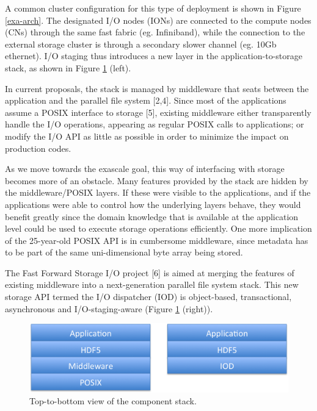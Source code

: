 \documentclass[conference]{IEEEtran}
\begin{document}
A common cluster configuration for this type of deployment is shown in
Figure \ref{exa-arch}. The designated I/O nodes (IONs) are connected to
the compute nodes (CNs) through the same fast fabric (eg. Infiniband),
while the connection to the external storage cluster is through a
secondary slower channel (eg. 10Gb ethernet). I/O staging thus
introduces a new layer in the application-to-storage stack, as shown in
Figure \ref{exa-stack} (left).

In current proposals, the stack is managed by middleware that seats
between the application and the parallel file system {[}2,4{]}. Since
most of the applications assume a POSIX interface to storage {[}5{]},
existing middleware either transparently handle the I/O operations,
appearing as regular POSIX calls to applications; or modify the I/O API
as little as possible in order to minimize the impact on production
codes.

As we move towards the exascale goal, this way of interfacing with
storage becomes more of an obstacle. Many features provided by the stack
are hidden by the middleware/POSIX layers. If these were visible to the
applications, and if the applications were able to control how the
underlying layers behave, they would benefit greatly since the domain
knowledge that is available at the application level could be used to
execute storage operations efficiently. One more implication of the
25-year-old POSIX API is in cumbersome middleware, since metadata has to
be part of the same uni-dimensional byte array being stored.

The Fast Forward Storage I/O project {[}6{]} is aimed at merging the
features of existing middleware into a next-generation parallel file
system stack. This new storage API termed the I/O dispatcher (IOD) is
object-based, transactional, asynchronous and I/O-staging-aware (Figure
\ref{exa-stack} (right)).

\begin{figure}[htbp]
\centering
\includegraphics[scale=0.30]{images/exa-stack.png}
\caption{Top-to-bottom view of the component stack. \label{exa-stack}}
\end{figure}
\end{document}
